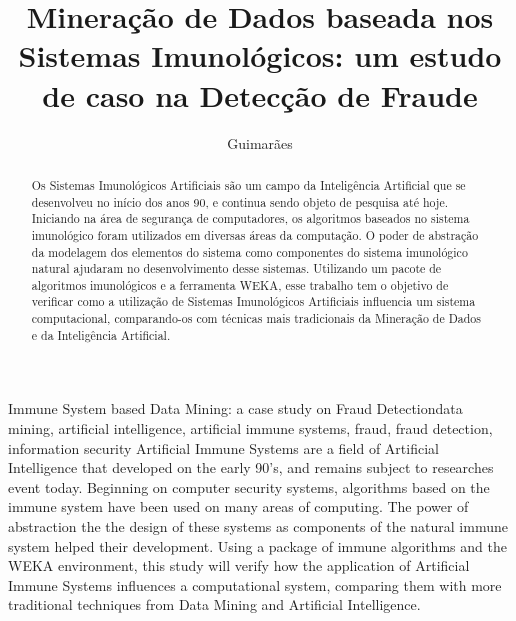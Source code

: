 \documentclass{iiufrgs}
\title{Mineração de Dados baseada nos Sistemas Imunológicos: um estudo de caso na Detecção de Fraude}
\author{Guimarães}{Bruno Barcarol}
\begin{document}
\maketitle

\tableofcontents

\listoffigures

\listoftables

\printnomenclature

\begin{abstract}
    Os Sistemas Imunológicos Artificiais são um campo da Inteligência Artificial que se desenvolveu no início dos anos 90, e continua sendo objeto de pesquisa até hoje. Iniciando na área de segurança de computadores, os algoritmos baseados no sistema imunológico foram utilizados em diversas áreas da computação. O poder de abstração da modelagem dos elementos do sistema como componentes do sistema imunológico natural ajudaram no desenvolvimento desse sistemas. Utilizando um pacote de algoritmos imunológicos e a ferramenta WEKA, esse trabalho tem o objetivo de verificar como a utilização de Sistemas Imunológicos Artificiais influencia um sistema computacional, comparando-os com técnicas mais tradicionais da Mineração de Dados e da Inteligência Artificial.
\end{abstract}

\begin{englishabstract}{Immune System based Data Mining: a case study on Fraud Detection}{data mining, artificial intelligence, artificial immune systems, fraud, fraud detection, information security}
    Artificial Immune Systems are a field of Artificial Intelligence that developed on the early 90's, and remains subject to researches event today. Beginning on computer security systems, algorithms based on the immune system have been used on many areas of computing. The power of abstraction the the design of these systems as components of the natural immune system helped their development. Using a package of immune algorithms and the WEKA environment, this study will verify how the application of Artificial Immune Systems influences a computational system, comparing them with more traditional techniques from Data Mining and Artificial Intelligence.
\end{englishabstract}












\end{document}
